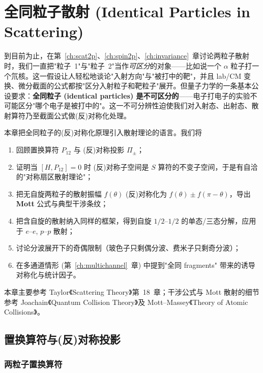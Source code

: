 \chapter{全同粒子散射 (Identical Particles in Scattering)}\label{ch:identical}

到目前为止，在第~\ref{ch:scat2p}、\ref{ch:spin2p}、\ref{ch:invariance}~章讨论两粒子散射时，我们一直把"粒子~1"与"粒子~2"当作\emph{可区分}的对象——比如说一个 $\alpha$ 粒子打一个氘核。这一假设让人轻松地谈论"入射方向"与"被打中的靶"，并且 lab/CM 变换、微分截面的公式都按"区分入射粒子和靶粒子"展开。但量子力学的一条基本公设要求：\textbf{全同粒子 (identical particles) 是不可区分的}——电子打电子的实验不可能区分"哪个电子是被打中的"。这一不可分辨性迫使我们对入射态、出射态、散射算符乃至截面公式做(反)对称化处理。

本章把全同粒子的(反)对称化原理引入散射理论的语言。我们将
\begin{enumerate}
  \item 回顾置换算符 $P_{12}$ 与 (反)对称投影 $\Pi_\pm$；
  \item 证明当 $[H,P_{12}]=0$ 时 (反)对称子空间是 $S$ 算符的不变子空间，于是有自洽的"对称扇区散射理论"；
  \item 把无自旋两粒子的散射振幅 $f(\theta)$ (反)对称化为 $f(\theta)\pm f(\pi-\theta)$，导出 \textbf{Mott} 公式与典型干涉条纹；
  \item 把含自旋的散射纳入同样的框架，得到自旋 $1/2$--$1/2$ 的单态/三态分解，应用于 $e$--$e$, $p$--$p$ 散射；
  \item 讨论分波展开下的奇偶限制（玻色子只剩偶分波、费米子只剩奇分波）；
  \item 在多通道情形 (第~\ref{ch:multichannel}~章) 中提到"全同 fragments" 带来的诱导对称化与统计因子。
\end{enumerate}

本章主要参考 Taylor《Scattering Theory》第~18~章；干涉公式与 Mott 散射的细节参考 Joachain《Quantum Collision Theory》及 Mott--Massey《Theory of Atomic Collisions》。

\section{置换算符与(反)对称投影}\label{sec:id-perm}

\subsection{两粒子置换算符}\label{sec:id-P12}

